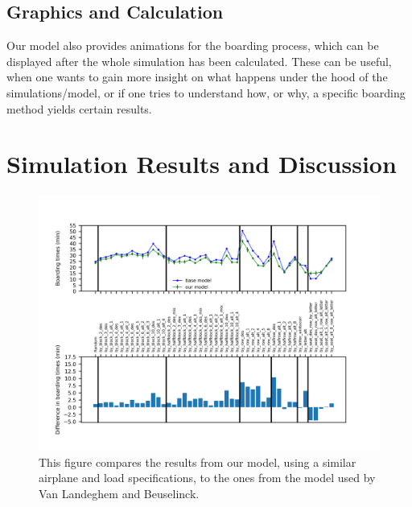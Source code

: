 \documentclass[11pt]{article}
\begin{document}
\subsection{Graphics and Calculation}
Our model also provides animations for the boarding process, which can be displayed after the whole simulation has been calculated. These can be useful, when one wants to gain more insight on what happens under the hood of the simulations/model, or if one tries to understand how, or why, a specific boarding method yields certain results.

 



\section{Simulation Results and Discussion}
\begin{figure}
	\includegraphics[width=\linewidth]{../../code/AirplaneBoarding/data/figure1/figure1.png}
	\caption{This figure compares the results from our model, using a similar airplane and load specifications, to the ones from the model used by Van Landeghem and Beuselinck.}
	\label{figure1}
\end{figure}
\end{document}
